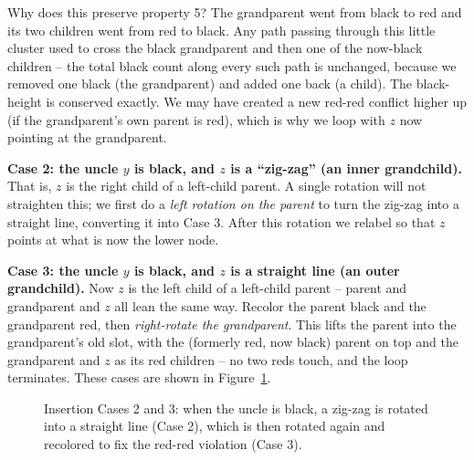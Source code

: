 Why does this preserve property 5? The grandparent went from black to red and its
two children went from red to black. Any path passing through this little cluster
used to cross the black grandparent and then one of the now-black children -- the
total black count along every such path is unchanged, because we removed one black
(the grandparent) and added one back (a child). The black-height is conserved
exactly. We may have created a new red-red conflict higher up (if the grandparent's
own parent is red), which is why we loop with $z$ now pointing at the grandparent.

\textbf{Case 2: the uncle $y$ is black, and $z$ is a ``zig-zag'' (an inner
grandchild).} That is, $z$ is the right child of a left-child parent. A single
rotation will not straighten this; we first do a \emph{left rotation on the
parent} to turn the zig-zag into a straight line, converting it into Case 3.
After this rotation we relabel so that $z$ points at what is now the lower node.

\textbf{Case 3: the uncle $y$ is black, and $z$ is a straight line (an outer
grandchild).} Now $z$ is the left child of a left-child parent -- parent and
grandparent and $z$ all lean the same way. Recolor the parent black and the
grandparent red, then \emph{right-rotate the grandparent}. This lifts the parent
into the grandparent's old slot, with the (formerly red, now black) parent on top
and the grandparent and $z$ as its red children -- no two reds touch, and the
loop terminates. These cases are shown in Figure~\ref{fig:insert-case-2-3}.

\begin{figure}[htbp]
\centering
{}
\caption{Insertion Cases 2 and 3: when the uncle is black, a zig-zag is rotated into a straight line (Case 2), which is then rotated again and recolored to fix the red-red violation (Case 3).}
\label{fig:insert-case-2-3}
\end{figure}


